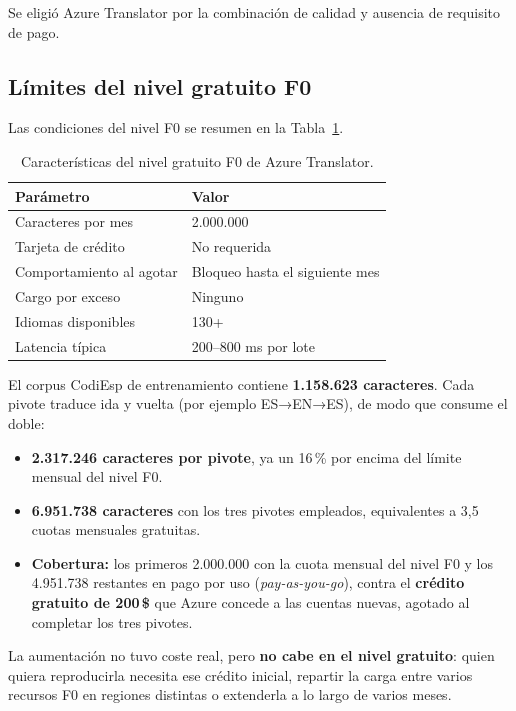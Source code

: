Se eligió Azure Translator por la combinación de calidad y ausencia de requisito de pago.

\subsection{Límites del nivel gratuito F0}

Las condiciones del nivel F0 se resumen en la Tabla~\ref{tab:azure-f0}.

\begin{table}[h]
\centering
\small
\caption{Características del nivel gratuito F0 de Azure Translator.}
\label{tab:azure-f0}
\begin{tabular}{ll}
\hline
\textbf{Parámetro} & \textbf{Valor} \\
\hline
Caracteres por mes         & 2.000.000 \\
Tarjeta de crédito         & No requerida \\
Comportamiento al agotar   & Bloqueo hasta el siguiente mes \\
Cargo por exceso           & Ninguno \\
Idiomas disponibles        & 130+ \\
Latencia típica            & 200--800 ms por lote \\
\hline
\end{tabular}
\end{table}

El corpus CodiEsp de entrenamiento contiene \textbf{1.158.623 caracteres}. Cada pivote traduce ida y vuelta (por ejemplo ES→EN→ES), de modo que consume el doble:

\begin{itemize}
 \item \textbf{2.317.246 caracteres por pivote}, ya un 16\,\% por encima del límite mensual del nivel F0.
 \item \textbf{6.951.738 caracteres} con los tres pivotes empleados, equivalentes a 3,5 cuotas mensuales gratuitas.
 \item \textbf{Cobertura:} los primeros 2.000.000 con la cuota mensual del nivel F0 y los 4.951.738 restantes en pago por uso (\emph{pay-as-you-go}), contra el \textbf{crédito gratuito de 200\,\$} que Azure concede a las cuentas nuevas, agotado al completar los tres pivotes.
\end{itemize}

La aumentación no tuvo coste real, pero \textbf{no cabe en el nivel gratuito}: quien quiera reproducirla necesita ese crédito inicial, repartir la carga entre varios recursos F0 en regiones distintas o extenderla a lo largo de varios meses.


